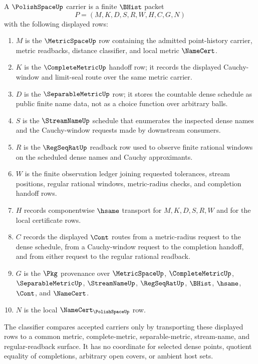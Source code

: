 \begin{definition}
\label{def:polish-space-carrier}
A $\PolishSpaceUp$ carrier is a finite $\BHist$ packet
$$
P=(M,K,D,S,R,W,H,C,G,N)
$$
with the following displayed rows:
\begin{enumerate}
\item $M$ is the $\MetricSpaceUp$ row containing the admitted point-history
carrier, metric readbacks, distance classifier, and local metric
$\NameCert$.
\item $K$ is the $\CompleteMetricUp$ handoff row; it records the displayed
Cauchy-window and limit-seal route over the same metric carrier.
\item $D$ is the $\SeparableMetricUp$ row; it stores the countable dense
schedule as public finite name data, not as a choice function over arbitrary
balls.
\item $S$ is the $\StreamNameUp$ schedule that enumerates the inspected dense
names and the Cauchy-window requests made by downstream consumers.
\item $R$ is the $\RegSeqRatUp$ readback row used to observe finite rational
windows on the scheduled dense names and Cauchy approximants.
\item $W$ is the finite observation ledger joining requested tolerances,
stream positions, regular rational windows, metric-radius checks, and
completion handoff rows.
\item $H$ records componentwise $\hsame$ transport for $M,K,D,S,R,W$ and for
the local certificate rows.
\item $C$ records the displayed $\Cont$ routes from a metric-radius request to
the dense schedule, from a Cauchy-window request to the completion handoff,
and from either request to the regular rational readback.
\item $G$ is the $\Pkg$ provenance over $\MetricSpaceUp$,
$\CompleteMetricUp$, $\SeparableMetricUp$, $\StreamNameUp$, $\RegSeqRatUp$,
$\BHist$, $\hsame$, $\Cont$, and $\NameCert$.
\item $N$ is the local $\NameCert_{\PolishSpaceUp}$ row.
\end{enumerate}
The classifier compares accepted carriers only by transporting these displayed
rows to a common metric, complete-metric, separable-metric, stream-name, and
regular-readback surface. It has no coordinate for selected dense points,
quotient equality of completions, arbitrary open covers, or ambient host
sets.
\end{definition}

